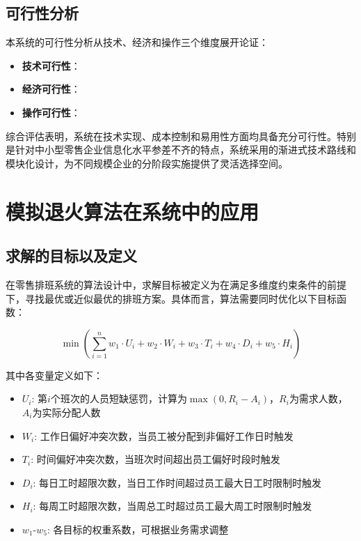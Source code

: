 \documentclass{ctexart}
\begin{document}
\subsection{可行性分析}
本系统的可行性分析从技术、经济和操作三个维度展开论证：

\begin{itemize}
    \item \textbf{技术可行性}：

    \item \textbf{经济可行性}：

    \item \textbf{操作可行性}：
\end{itemize}
综合评估表明，系统在技术实现、成本控制和易用性方面均具备充分可行性。特别是针对中小型零售企业信息化水平参差不齐的特点，系统采用的渐进式技术路线和模块化设计，为不同规模企业的分阶段实施提供了灵活选择空间。

\section{模拟退火算法在系统中的应用}
\subsection{求解的目标以及定义}
在零售排班系统的算法设计中，求解目标被定义为在满足多维度约束条件的前提下，寻找最优或近似最优的排班方案。具体而言，算法需要同时优化以下目标函数：

\begin{equation}
    \min \left( \sum_{i=1}^{n} w_1 \cdot U_i + w_2 \cdot W_i + w_3 \cdot T_i + w_4 \cdot D_i + w_5 \cdot H_i \right)
\end{equation}

其中各变量定义如下：
\begin{itemize}
    \item $U_i$: 第$i$个班次的人员短缺惩罚，计算为$\max(0, R_i - A_i)$，$R_i$为需求人数，$A_i$为实际分配人数
    \item $W_i$: 工作日偏好冲突次数，当员工被分配到非偏好工作日时触发
    \item $T_i$: 时间偏好冲突次数，当班次时间超出员工偏好时段时触发
    \item $D_i$: 每日工时超限次数，当日工作时间超过员工最大日工时限制时触发
    \item $H_i$: 每周工时超限次数，当周总工时超过员工最大周工时限制时触发
    \item $w_1$-$w_5$: 各目标的权重系数，可根据业务需求调整
\end{itemize}
\end{document}
